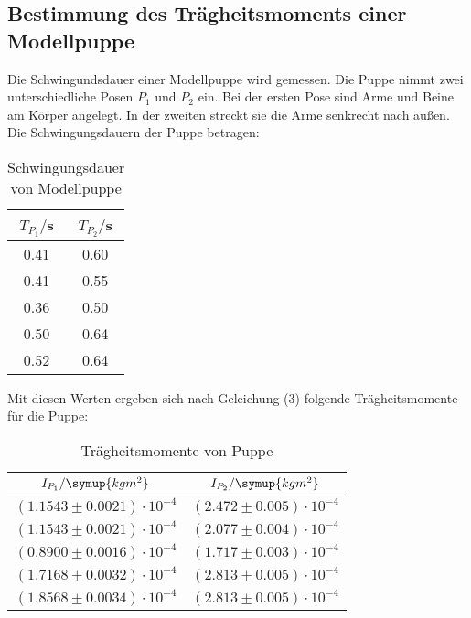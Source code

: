 \subsection{Bestimmung des Trägheitsmoments einer Modellpuppe}
Die Schwingundsdauer einer Modellpuppe wird gemessen. Die Puppe nimmt zwei unterschiedliche
Posen $P_1$ und $P_2$ ein. Bei der ersten Pose sind Arme und Beine am Körper angelegt. In der zweiten
streckt sie die Arme senkrecht nach außen. Die Schwingungsdauern der Puppe betragen:
\begin{table}
  \centering
  \caption{Schwingungsdauer von Modellpuppe}
  \label{tab:Schwingungsdauer von Modellpuppe}
  \begin{tabular}{c c}
    \toprule
    $T_{P_1}/$s & $T_{P_2}/$s \\
    \midrule
    0.41 & 0.60 \\
    0.41 & 0.55 \\
    0.36 & 0.50 \\
    0.50 & 0.64 \\
    0.52 & 0.64 \\
    \bottomrule
  \end{tabular}
\end{table}

Mit diesen Werten ergeben sich nach Geleichung (3) folgende Trägheitsmomente
für die Puppe:
\begin{table}[H]
  \centering
  \caption{Trägheitsmomente von Puppe}
  \label{tab:Trägheitsmomente von Puppe}
  \begin{tabular}{c c}
    \toprule
    $I_{P_1}/\symup{kgm^2}$ & $I_{P_2}/\symup{kgm^2}$ \\
    \midrule
    $(1.1543 \pm 0.0021)\cdot 10^{-4}$ & $(2.472 \pm 0.005)\cdot 10^{-4}$ \\
    $(1.1543 \pm 0.0021)\cdot 10^{-4}$ & $(2.077 \pm 0.004)\cdot 10^{-4}$ \\
    $(0.8900 \pm 0.0016)\cdot 10^{-4}$ & $(1.717 \pm 0.003)\cdot 10^{-4}$ \\
    $(1.7168 \pm 0.0032)\cdot 10^{-4}$ & $(2.813 \pm 0.005)\cdot 10^{-4}$ \\
    $(1.8568 \pm 0.0034)\cdot 10^{-4}$ & $(2.813 \pm 0.005)\cdot 10^{-4}$ \\
    \bottomrule
  \end{tabular}
\end{table}

